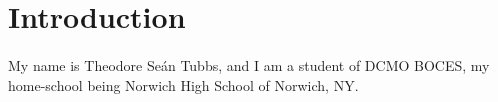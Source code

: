 \section{Introduction}
\paragraph{}
My name is Theodore Se\'{a}n Tubbs, and I am a student of DCMO BOCES, my home-school being Norwich High School of Norwich, NY.
